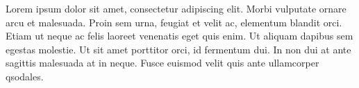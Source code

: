 \documentclass[master,final,12pt]{iscs-thesis}
\date{August 28, 2013}
\begin{document}

\begin{jabstract}
Lorem ipsum dolor sit amet, consectetur adipiscing elit.  Morbi
vulputate ornare arcu et malesuada.  Proin sem urna, feugiat et velit
ac, elementum blandit orci.  Etiam ut neque ac felis laoreet venenatis
eget quis enim.  Ut aliquam dapibus sem egestas molestie.  Ut sit amet
porttitor orci, id fermentum dui.  In non dui at ante sagittis
malesuada at in neque.  Fusce euismod velit quis ante ullamcorper
qsodales.
\end{jabstract}
\maketitle



\frontmatter
\tableofcontents

\mainmatter











\end{document}
